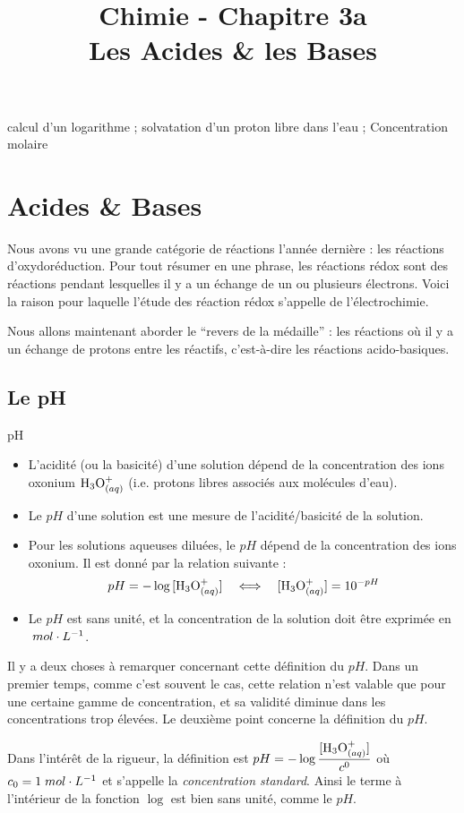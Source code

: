 \documentclass[11pt,a4paper]{article}
\title{\large Chimie - Chapitre 3a \\ \LARGE  Les Acides \& les Bases}
\begin{document}
\maketitle
\vspace{-1cm}
\begin{tcolorbox}[title=Notions de la classe de première à rappeler]
calcul d'un logarithme ; solvatation d'un proton libre dans l'eau ; Concentration molaire
\end{tcolorbox}
\tableofcontents

\section{Acides \& Bases}
Nous avons vu une grande catégorie de réactions l'année dernière : les réactions d'oxydoréduction. Pour tout résumer en une phrase, les réactions rédox sont des réactions pendant lesquelles il y a un échange de un ou plusieurs électrons. Voici la raison pour laquelle l'étude des réaction rédox s'appelle de l'électrochimie. 

Nous allons maintenant aborder le ``revers de la médaille'' : les réactions où il y a un échange de protons entre les réactifs, c'est-à-dire les réactions acido-basiques. 

\subsection{Le pH}

\begin{defn}{pH }
\begin{itemize}
    \item L'acidité (ou la basicité) d'une solution dépend de la concentration des ions oxonium  $\oxo$ (i.e. protons libres associés aux molécules d’eau).
    \item Le $pH$ d'une solution est une mesure de l'acidité/basicité de la solution.
    \item Pour les solutions aqueuses diluées, le $pH$ dépend de la concentration des ions oxonium. Il est donné par la relation suivante : 
    \[  pH = -\log{[\oxo]} \quad \Longleftrightarrow \quad [\oxo] = 10^{-pH}\] 
    \item Le $pH$ est sans unité, et la concentration de la solution doit être exprimée en $\; mol\cdot L^{-1}$. 
\end{itemize}
\end{defn}

\begin{rmrq} Il y a deux choses à remarquer concernant cette définition du $pH$. Dans un premier temps, comme c'est souvent le cas, cette relation n'est valable que pour une certaine gamme de concentration, et sa validité diminue dans les concentrations trop élevées. Le deuxième point concerne la définition du $pH$. 

Dans l'intérêt de la rigueur, la définition est $pH = -\log{\dfrac{[\oxo]}{c^0}}$ où $c_0 = 1\; mol\cdot L^{-1}$ et s'appelle la \emph{concentration standard}. Ainsi le terme à l'intérieur de la fonction $\log$ est bien sans unité, comme le $pH$. 
\end{rmrq}
\end{document}
